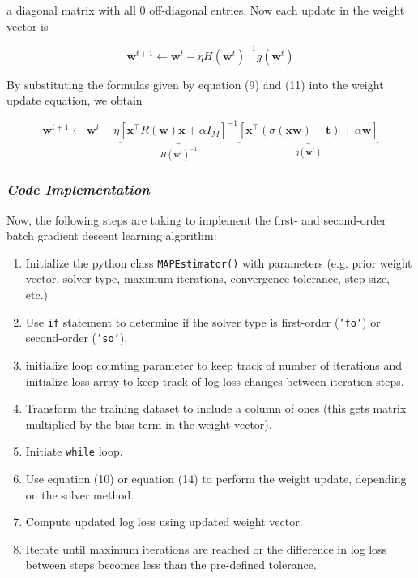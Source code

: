 \documentclass[11pt]{extarticle}
\begin{document}
a diagonal matrix with all 0 off-diagonal entries. Now each update in the weight vector is

\begin{equation}
\mathbf{w}^{t+1} \leftarrow \mathbf{w}^{t} - \eta H(\mathbf{w}^{t})^{-1} g(\mathbf{w}^{t})
\end{equation}

By substituting the formulas given by equation (9) and (11) into the weight update equation, we obtain

\begin{equation}
\mathbf{w}^{t+1} \leftarrow \mathbf{w}^{t} - \eta \underbrace{\left[ \mathbf{x}^\top R(\mathbf{w}) \mathbf{x} + \alpha I_M \right]^{-1}}_{H(\mathbf{w}^t)^{-1}} \underbrace{\left[ \mathbf{x}^\top (\sigma(\mathbf{x} \textbf{w}) - \mathbf{t}) + \alpha \mathbf{w} \right]}_{g(\mathbf{w}^t)}
\end{equation}

\subsubsection{\textit{Code Implementation}}

Now, the following steps are taking to implement the first- and second-order batch gradient descent learning algorithm:

\begin{enumerate}
\item Initialize the python class \texttt{MAPEstimator()} with parameters (e.g. prior weight vector, solver type, maximum iterations, convergence tolerance, step size, etc.)
\item Use \texttt{if} statement to determine if the solver type is first-order (\texttt{'fo'}) or second-order (\texttt{'so'}).
\item initialize loop counting parameter to keep track of number of iterations and initialize loss array to keep track of log loss changes between iteration steps.
\item Transform the training dataset to include a column of ones (this gets matrix multiplied by the bias term in the weight vector).
\item Initiate \texttt{while} loop.
\item Use equation (10) or equation (14) to perform the weight update, depending on the solver method.
\item Compute updated log loss using updated weight vector.
\item Iterate until maximum iterations are reached or the difference in log loss between steps becomes less than the pre-defined tolerance.
\end{enumerate}
\end{document}

